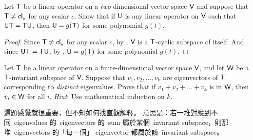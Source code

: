 \begin{exercise} \label{exercise 5.4.22}
Let \(\textsf{T}\) be a linear operator on a \emph{two}-dimensional vector space \(\textsf{V}\) and suppose that \(\textsf{T} \ne c \textsf{I}_{_{\textsf{V}}}{}\) for any scalar \(c\).
Show that if \(\textsf{U}\) is any linear operator on \(\textsf{V}\) such that \(\textsf{U}\textsf{T} = \textsf{T}\textsf{U}\), then \(\textsf{U} = g(\textsf{T})\) for some polynomial \(g(t)\).
\end{exercise}

\begin{proof}
Since \(\textsf{T} \ne c \textsf{I}_{_{\textsf{V}}}{}\) for any scalar \(c\), by , \(\textsf{V}\) is a \(\textsf{T}\)-cyclic subspace of itself.
And since \(\textsf{U}\textsf{T} = \textsf{T}\textsf{U}\), by , \(\textsf{U} = g(\textsf{T})\) for some polynomial \(g(t)\).
\end{proof}

\begin{exercise} \label{exercise 5.4.23}
Let \(\textsf{T}\) be a linear operator on a finite-dimensional vector space \(\textsf{V}\), and let \(\textsf{W}\) be a \(\textsf{T}\)-invariant subspace of \(\textsf{V}\).
Suppose that \(v_1, v_2, ..., v_k\) are eigenvectors of \(\textsf{T}\) corresponding to \emph{distinct} eigenvalues.
Prove that if \(v_1 + v_2 + ... + v_k\) is in \(\textsf{W}\), then \(v_i \in \textsf{W}\) for all \(i\).
\emph{Hint}: Use mathematical induction on \(k\).
\end{exercise}

\begin{note}
這題感覺就很重要，但不知如何找直觀解釋。
意思是：若一堆對應到不同\ eigenvalues 的\ eigenvectors 的\ sum 屬於某個\ invariant subspace，則那堆\ eigenvectors 的「每一個」 eigenvector 都屬於該\ invariant subspace。
\end{note}


